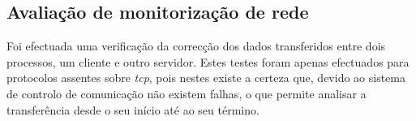 %
%
%

\subsection{Avaliação de monitorização de rede}

Foi efectuada uma verificação da correcção dos dados transferidos entre dois processos, um cliente e outro servidor.
Estes testes foram apenas efectuados para protocolos assentes sobre \textit{tcp}, pois nestes existe a certeza que, devido ao sistema de controlo de comunicação não existem falhas, o que permite analisar a transferência desde o seu início até ao seu término.

